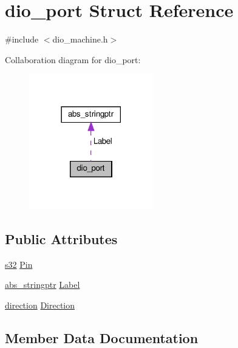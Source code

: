 \hypertarget{structdio__port}{}\section{dio\+\_\+port Struct Reference}
\label{structdio__port}


{\ttfamily \#include $<$dio\+\_\+machine.\+h$>$}



Collaboration diagram for dio\+\_\+port\+:\nopagebreak
\begin{figure}[H]
\begin{center}
\leavevmode
\includegraphics[width=153pt]{d1/d3a/structdio__port__coll__graph}
\end{center}
\end{figure}
\subsection*{Public Attributes}
\begin{DoxyCompactItemize}
\item 
\hyperlink{ab__common_8h_ae9b1af5c037e57a98884758875d3a7c4}{s32} \hyperlink{structdio__port_a4cad63c96a1b03d4e85d107781a119c7}{Pin}
\item 
\hyperlink{structabs__stringptr}{abs\+\_\+stringptr} \hyperlink{structdio__port_a9135b29613e9dee6b732d3662764f4a2}{Label}
\item 
\hyperlink{adsio_8h_a99f26e6ee9fcd62f75203b5402df8098}{direction} \hyperlink{structdio__port_a2a5027ad90ea005ad1cd90ec35d42271}{Direction}
\end{DoxyCompactItemize}


\subsection{Member Data Documentation}
\mbox{\label{structdio__port_a2a5027ad90ea005ad1cd90ec35d42271}} 
